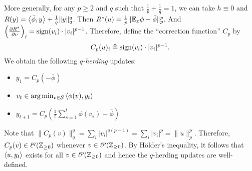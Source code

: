 \documentclass[paper.tex]{subfiles}
\begin{document}
More generally, for any 
$p \geq 2$ and $q$ such that $\frac{1}{p} + \frac{1}{q} = 1$, we can take 
$h \equiv 0$ and $R(y) = \left\langle \bar{\phi}, y \right\rangle + \frac{1}{q}\|y\|_q^q$. 
Then $R^*(u) = \frac{1}{p}\|\mathbb{E}_{x}\phi-\bar{\phi}\|_p^p$. And 
$\left(\frac{\partial R^*}{\partial v}\right)_i = \operatorname{sign}(v_i) \cdot |v_i|^{p-1}$. 
Therefore, define the ``correction function'' $C_p$ by
\begin{equation}
C_p(u)_i \triangleq \operatorname{sign}(v_i) \cdot |v_i|^{p-1}.
\end{equation}
We obtain the following \emph{$q$-herding} updates:
\begin{itemize}
\item $y_{1} = C_p(-\bar{\phi})$
\item $v_{t} \in \arg\min_{v \in \mathcal{S}} \left\langle \phi(v), y_t \right\rangle$
\item $y_{t+1} = C_p\left(\frac{1}{t} \sum_{s=1}^t \phi(v_s)-\bar{\phi}\right)$
\end{itemize}
Note that $\|C_p(v)\|_q^q = \sum_{i} |v_i|^{q(p-1)} = \sum_{i} |v_i|^p = \|u\|_p^p$. 
Therefore, $C_p(v) \in \ell^q(\mathbb{Z}_{\geq 0})$ whenever $v \in \ell^p(\mathbb{Z}_{\geq 0})$. By 
H\"{o}lder's inequality, it follows that $\left\langle u, y_t \right\rangle$ exists for all 
$v \in \ell^p(\mathbb{Z}_{\geq 0})$ and hence the $q$-herding updates are well-defined.
\end{document}
